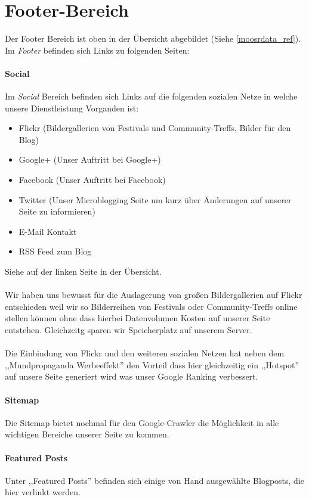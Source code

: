\section{Footer-Bereich}
Der Footer Bereich ist oben in der Übersicht abgebildet (Siehe
\ref{moosrdata_ref}).
Im \emph{Footer} befinden sich Links zu folgenden Seiten:

\paragraph{Social}
Im \emph{Social} Bereich befinden sich Links auf die folgenden sozialen Netze in
welche unsere Dienstleistung Vorganden ist:
\begin{itemize}
\item Flickr (Bildergallerien von Festivals und Community-Treffs, Bilder für den
    Blog)
\item Google+ (Unser Auftritt bei Google+)
\item Facebook (Unser Auftritt bei Facebook)
\item Twitter (Unser Microblogging Seite um kurz über Änderungen auf unserer
Seite zu informieren)
\item E-Mail Kontakt
\item RSS Feed zum Blog
\end{itemize}

Siehe auf der linken Seite in der Übersicht.
\\
\\
Wir haben uns bewusst für die Auslagerung von großen Bildergallerien auf Flickr
entschieden weil wir so Bilderreihen von Festivals oder Community-Treffs online
stellen können ohne dass hierbei Datenvolumen Kosten auf unserer Seite
entstehen. Gleichzeitg sparen wir Speicherplatz auf unserem Server.
\\
\\
Die Einbindung von Flickr und den weiteren sozialen Netzen hat neben dem
,,Mundpropaganda Werbeeffekt'' den Vorteil dass hier gleichzeitig ein
,,Hotspot'' auf unsere Seite generiert wird was unser Google Ranking verbessert.

\paragraph{Sitemap}
Die Sitemap bietet nochmal für den Google-Crawler die Möglichkeit in
alle wichtigen Bereiche unserer Seite zu kommen.
\paragraph{Featured Posts}
Unter ,,Featured Posts'' befinden sich einige von Hand ausgewählte Blogposts,
die hier verlinkt werden.

